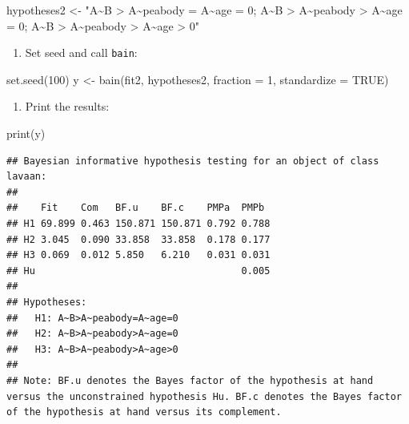\documentclass[
]{book}
\newenvironment{Shaded}{\begin{snugshade}}{\end{snugshade}}
\newcommand{\AttributeTok}[1]{\textcolor[rgb]{0.77,0.63,0.00}{#1}}
\newcommand{\ConstantTok}[1]{\textcolor[rgb]{0.00,0.00,0.00}{#1}}
\newcommand{\DecValTok}[1]{\textcolor[rgb]{0.00,0.00,0.81}{#1}}
\newcommand{\FunctionTok}[1]{\textcolor[rgb]{0.00,0.00,0.00}{#1}}
\newcommand{\NormalTok}[1]{#1}
\newcommand{\OtherTok}[1]{\textcolor[rgb]{0.56,0.35,0.01}{#1}}
\newcommand{\StringTok}[1]{\textcolor[rgb]{0.31,0.60,0.02}{#1}}
\providecommand{\tightlist}{%
  \setlength{\itemsep}{0pt}\setlength{\parskip}{0pt}}
\begin{document}
\begin{Shaded}
\begin{Highlighting}[]
\NormalTok{hypotheses2 }\OtherTok{\textless{}{-}} \StringTok{"A\textasciitilde{}B \textgreater{} A\textasciitilde{}peabody = A\textasciitilde{}age = 0; }
\StringTok{               A\textasciitilde{}B \textgreater{} A\textasciitilde{}peabody \textgreater{} A\textasciitilde{}age = 0; }
\StringTok{A\textasciitilde{}B \textgreater{} A\textasciitilde{}peabody \textgreater{} A\textasciitilde{}age \textgreater{} 0"}
\end{Highlighting}
\end{Shaded}

\begin{enumerate}
\def\labelenumi{\arabic{enumi})}
\setcounter{enumi}{2}
\tightlist
\item
  Set seed and call \texttt{bain}:
\end{enumerate}

\begin{Shaded}
\begin{Highlighting}[]
\FunctionTok{set.seed}\NormalTok{(}\DecValTok{100}\NormalTok{)}
\NormalTok{y }\OtherTok{\textless{}{-}} \FunctionTok{bain}\NormalTok{(fit2, hypotheses2, }\AttributeTok{fraction =} \DecValTok{1}\NormalTok{, }\AttributeTok{standardize =} \ConstantTok{TRUE}\NormalTok{)}
\end{Highlighting}
\end{Shaded}

\begin{enumerate}
\def\labelenumi{\arabic{enumi})}
\setcounter{enumi}{3}
\tightlist
\item
  Print the results:
\end{enumerate}

\begin{Shaded}
\begin{Highlighting}[]
\FunctionTok{print}\NormalTok{(y)}
\end{Highlighting}
\end{Shaded}

\begin{verbatim}
## Bayesian informative hypothesis testing for an object of class lavaan:
## 
##    Fit    Com   BF.u    BF.c    PMPa  PMPb 
## H1 69.899 0.463 150.871 150.871 0.792 0.788
## H2 3.045  0.090 33.858  33.858  0.178 0.177
## H3 0.069  0.012 5.850   6.210   0.031 0.031
## Hu                                    0.005
## 
## Hypotheses:
##   H1: A~B>A~peabody=A~age=0
##   H2: A~B>A~peabody>A~age=0
##   H3: A~B>A~peabody>A~age>0
## 
## Note: BF.u denotes the Bayes factor of the hypothesis at hand versus the unconstrained hypothesis Hu. BF.c denotes the Bayes factor of the hypothesis at hand versus its complement.
\end{verbatim}
\end{document}

